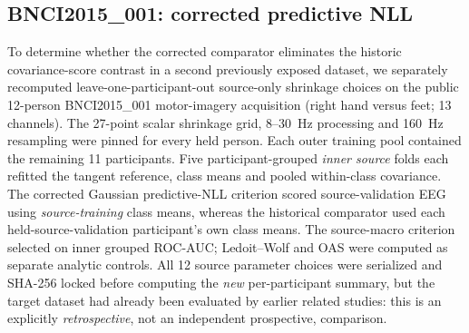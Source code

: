 \subsection{BNCI2015\_001: corrected predictive NLL}
\label{sec:p1-proper-bnci2015-new}
To determine whether the corrected comparator eliminates
the historic covariance-score contrast in a second
previously exposed dataset, we separately recomputed
leave-one-participant-out source-only shrinkage choices
on the public 12-person BNCI2015\_001 motor-imagery
acquisition (right hand versus feet; 13 channels).
The 27-point scalar shrinkage grid, 8--30~Hz processing
and 160~Hz resampling were pinned for every held person.
Each outer training pool contained the remaining 11
participants. Five participant-grouped \emph{inner
source} folds each refitted the tangent reference,
class means and pooled within-class covariance.
The corrected Gaussian predictive-NLL criterion
scored source-validation EEG using \emph{source-training}
class means, whereas the historical comparator used
each held-source-validation participant's own
class means. The source-macro criterion selected
on inner grouped ROC-AUC; Ledoit--Wolf and OAS
were computed as separate analytic controls.
All 12 source parameter choices were serialized and
SHA-256 locked before computing the \emph{new}
per-participant summary, but the target dataset had
already been evaluated by earlier related studies:
this is an explicitly \emph{retrospective}, not an
independent prospective, comparison.

